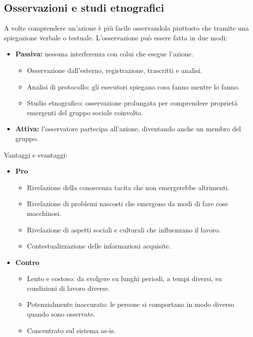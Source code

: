 \documentclass[../main.tex]{subfiles}
\begin{document}
\subsection{Osservazioni e studi etnografici}
A volte comprendere un'azione è più facile osservandola piuttosto che tramite una spiegazione verbale o testuale.
L'osservazione può essere fatta in due modi:
\begin{itemize}
	\item \textbf{Passiva:} nessuna interferenza con colui che esegue l'azione.
	\begin{itemize}
		\item Osservazione dall'esterno, registrazione, trascritti e analisi.
		\item Analisi di protocollo: gli esecutori spiegano cosa fanno mentre lo fanno.
		\item Studio etnografico: osservazione prolungata per comprendere proprietà emergenti del gruppo sociale coinvolto.
	\end{itemize}
	\item \textbf{Attiva:} l'osservatore partecipa all'azione, diventando anche un membro del gruppo.
\end{itemize}
Vantaggi e svantaggi:
\begin{itemize}
	\item \textbf{Pro}
	\begin{itemize}
		\item Rivelazione della conoscenza tacita che non emergerebbe altrimenti.
		\item Rivelazione di problemi nascosti che emergono da modi di fare cose macchinosi.
		\item Rivelazione di aspetti sociali e culturali che influenzano il lavoro.
		\item Contestualizzazione delle informazioni acquisite.
		\end{itemize}
	\item \textbf{Contro}
	\begin{itemize}
		\item Lento e costoso: da svolgere su lunghi periodi, a tempi diversi, su condizioni di lavoro diverse.
		\item Potenzialmente inaccurato: le persone si comportano in modo diverso quando sono osservate.
		\item Concentrato sul sistema as-is.
	\end{itemize}
\end{itemize}
\end{document}
